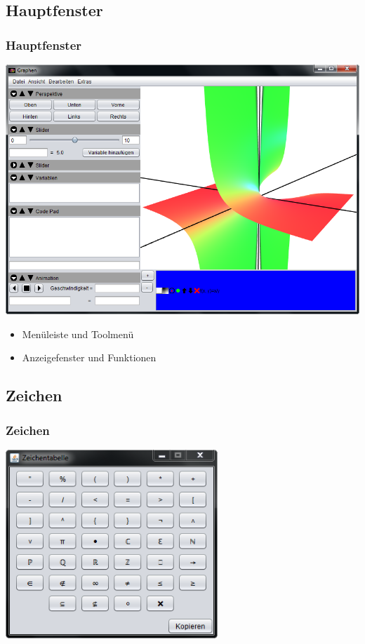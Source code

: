 \documentclass{beamer}
\begin{document}
\subsection{Hauptfenster} 
\begin{frame}\frametitle{Hauptfenster}
\includegraphics[height=0.7\textheight]{images/program/main-window.png}
\begin{itemize}
  \item Men\"uleiste und Toolmen\"u
  \item Anzeigefenster und Funktionen
\end{itemize}
\end{frame}

\subsection{Zeichen} 
\begin{frame}\frametitle{Zeichen}
\centering
\includegraphics[width=0.6\textwidth]{images/program/characters-window.png}
\end{frame}
\end{document}
